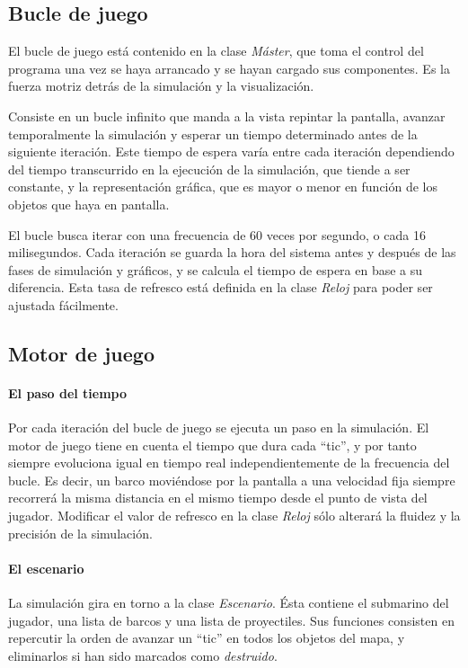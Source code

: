 \documentclass[a4paper,
	11pt,
	parskip=full,
	bibliography=totoc,
	twoside
	]{scrartcl}
\begin{document}
	\subsection{Bucle de juego}
	\label{subsec:bucle_juego}
		El bucle de juego está contenido en la clase \textit{Máster}, que toma el control del programa una vez se haya arrancado y se hayan cargado sus componentes. Es la fuerza motriz detrás de la simulación y la visualización.
		
		Consiste en un bucle infinito que manda a la vista repintar la pantalla, avanzar temporalmente la simulación y esperar un tiempo determinado antes de la siguiente iteración. Este tiempo de espera varía entre cada iteración dependiendo del tiempo transcurrido en la ejecución de la simulación, que tiende a ser constante, y la representación gráfica, que es mayor o menor en función de los objetos que haya en pantalla.
		
		El bucle busca iterar con una frecuencia de 60 veces por segundo, o cada 16 milisegundos. Cada iteración se guarda la hora del sistema antes y después de las fases de simulación y gráficos, y se calcula el tiempo de espera en base a su diferencia. Esta tasa de refresco está definida en la clase \textit{Reloj} para poder ser ajustada fácilmente.
	
	\subsection{Motor de juego}
	\label{subsec:motor_juego}
		\paragraph{El paso del tiempo}
			Por cada iteración del bucle de juego se ejecuta un paso en la simulación. El motor de juego tiene en cuenta el tiempo que dura cada ``tic'', y por tanto siempre evoluciona igual en tiempo real independientemente de la frecuencia del bucle. Es decir, un barco moviéndose por la pantalla a una velocidad fija siempre recorrerá la misma distancia en el mismo tiempo desde el punto de vista del jugador. Modificar el valor de refresco en la clase \textit{Reloj} sólo alterará la fluidez y la precisión de la simulación.
			
		\paragraph{El escenario}
			La simulación gira en torno a la clase \textit{Escenario}. Ésta contiene el submarino del jugador, una lista de barcos y una lista de proyectiles. Sus funciones consisten en repercutir la orden de avanzar un ``tic'' en todos los objetos del mapa, y eliminarlos si han sido marcados como \textit{destruido}.
		
\end{document}
